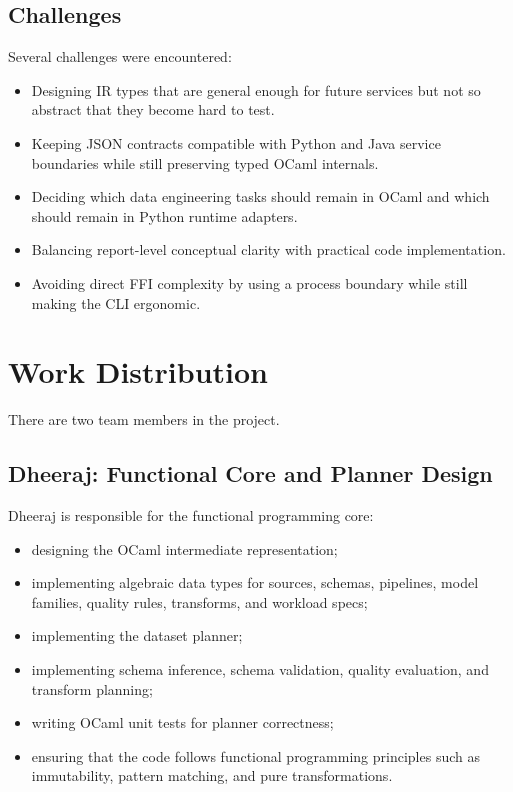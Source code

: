 \documentclass[conference]{IEEEtran}
\begin{document}
\subsection{Challenges}

Several challenges were encountered:

\begin{itemize}
  \item Designing IR types that are general enough for future services but not
  so abstract that they become hard to test.
  \item Keeping JSON contracts compatible with Python and Java service
  boundaries while still preserving typed OCaml internals.
  \item Deciding which data engineering tasks should remain in OCaml and which
  should remain in Python runtime adapters.
  \item Balancing report-level conceptual clarity with practical code
  implementation.
  \item Avoiding direct FFI complexity by using a process boundary while still
  making the CLI ergonomic.
\end{itemize}

\section{Work Distribution}

There are two team members in the project.

\subsection{Dheeraj: Functional Core and Planner Design}

Dheeraj is responsible for the functional programming core:

\begin{itemize}
  \item designing the OCaml intermediate representation;
  \item implementing algebraic data types for sources, schemas, pipelines,
  model families, quality rules, transforms, and workload specs;
  \item implementing the dataset planner;
  \item implementing schema inference, schema validation, quality evaluation,
  and transform planning;
  \item writing OCaml unit tests for planner correctness;
  \item ensuring that the code follows functional programming principles such
  as immutability, pattern matching, and pure transformations.
\end{itemize}
\end{document}
